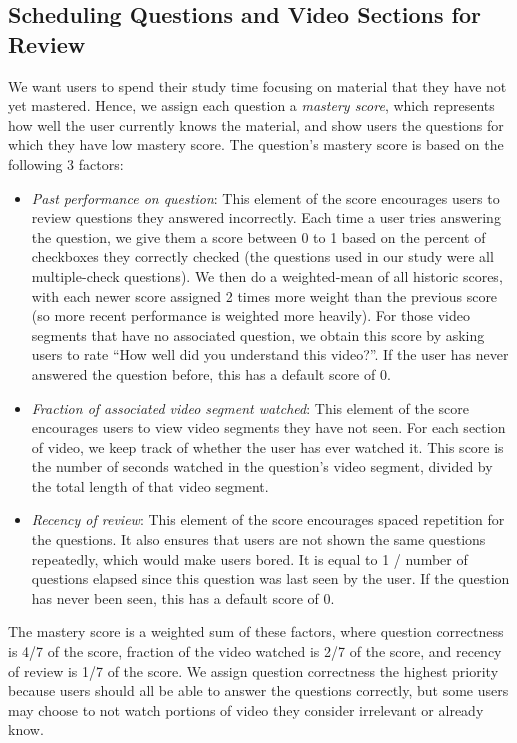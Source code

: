 \documentclass{sigchi}
\begin{document}
\subsection{Scheduling Questions and Video Sections for Review}

We want users to spend their study time focusing on material that they have not yet mastered. Hence, we assign each question a \emph{mastery score}, which represents how well the user currently knows the material, and show users the questions for which they have low mastery score. The question's mastery score is based on the following 3 factors:

\begin{itemize}
\item \emph{Past performance on question}: This element of the score encourages users to review questions they answered incorrectly. Each time a user tries answering the question, we give them a score between 0 to 1 based on the percent of checkboxes they correctly checked (the questions used in our study were all multiple-check questions). We then do a weighted-mean of all historic scores, with each newer score assigned 2 times more weight than the previous score (so more recent performance is weighted more heavily). For those video segments that have no associated question, we obtain this score by asking users to rate ``How well did you understand this video?''. If the user has never answered the question before, this has a default score of 0.
\item \emph{Fraction of associated video segment watched}: This element of the score encourages users to view video segments they have not seen. For each section of video, we keep track of whether the user has ever watched it. This score is the number of seconds watched in the question's video segment, divided by the total length of that video segment.
\item \emph{Recency of review}:  This element of the score encourages spaced repetition for the questions. It also ensures that users are not shown the same questions repeatedly, which would make users bored. It is equal to 1 / number of questions elapsed since this question was last seen by the user. If the question has never been seen, this has a default score of 0.
\end{itemize}

The mastery score is a weighted sum of these factors, where question correctness is 4/7 of the score, fraction of the video watched is 2/7 of the score, and recency of review is 1/7 of the score. We assign question correctness the highest priority because users should all be able to answer the questions correctly, but some users may choose to not watch portions of video they consider irrelevant or already know.
\end{document}
